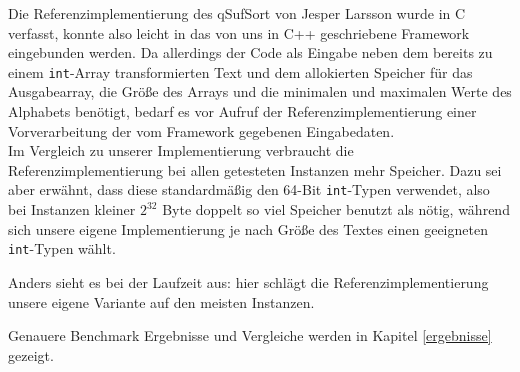 Die Referenzimplementierung des qSufSort von Jesper Larsson wurde in C verfasst, konnte also leicht in das von uns in C++ geschriebene Framework eingebunden werden. Da allerdings der Code als Eingabe neben dem bereits zu einem \texttt{int}-Array transformierten Text und dem allokierten Speicher für das Ausgabearray, die Größe des Arrays und die minimalen und maximalen Werte des Alphabets benötigt, bedarf es vor Aufruf der Referenzimplementierung einer Vorverarbeitung der vom Framework gegebenen Eingabedaten. \\
Im Vergleich zu unserer Implementierung verbraucht die Referenzimplementierung bei allen getesteten Instanzen mehr Speicher. Dazu sei aber erwähnt, dass diese standardmäßig den 64-Bit \texttt{int}-Typen verwendet, also bei Instanzen kleiner $2^{32}$ Byte doppelt so viel Speicher benutzt als nötig, während sich unsere eigene Implementierung je nach Größe des Textes einen geeigneten \texttt{int}-Typen wählt. 

Anders sieht es bei der Laufzeit aus: hier schlägt die Referenzimplementierung unsere eigene Variante auf den meisten Instanzen. 

Genauere Benchmark Ergebnisse und Vergleiche werden in Kapitel \ref{ergebnisse} gezeigt.